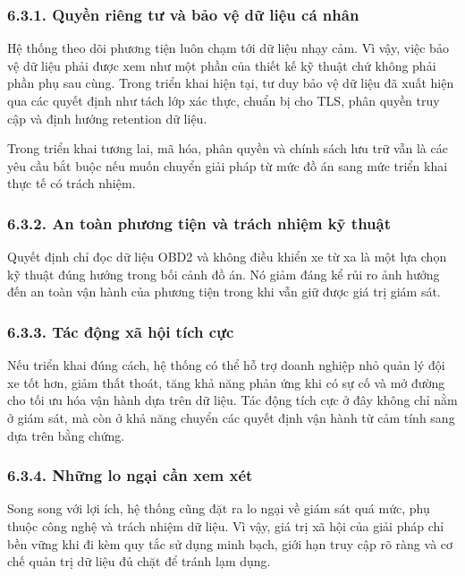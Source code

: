 \documentclass[a4paper]{extarticle}
\begin{document}
\subsubsection{6.3.1. Quyền riêng tư và bảo vệ dữ liệu cá
nhân}\label{631-quyux1ec1n-riuxeang-tux1b0-vuxe0-bux1ea3o-vux1ec7-dux1eef-liux1ec7u-cuxe1-nhuxe2n}

Hệ thống theo dõi phương tiện luôn chạm tới dữ liệu nhạy cảm. Vì vậy, việc bảo vệ dữ liệu phải được xem như một phần của thiết kế kỹ thuật chứ không phải phần phụ sau cùng. Trong triển khai hiện tại, tư duy bảo vệ dữ liệu đã xuất hiện qua các quyết định như tách lớp xác thực, chuẩn bị cho TLS, phân quyền truy cập và định hướng retention dữ liệu.

Trong triển khai tương lai, mã hóa, phân quyền và chính sách lưu trữ vẫn là các yêu cầu bắt buộc nếu muốn chuyển giải pháp từ mức đồ án sang mức triển khai thực tế có trách nhiệm.

\subsubsection{6.3.2. An toàn phương tiện và trách nhiệm kỹ
thuật}\label{632-an-touxe0n-phux1b0ux1a1ng-tiux1ec7n-vuxe0-truxe1ch-nhiux1ec7m-kux1ef9-thuux1eadt}

Quyết định chỉ đọc dữ liệu OBD2 và không điều khiển xe từ xa là một lựa chọn kỹ thuật đúng hướng trong bối cảnh đồ án. Nó giảm đáng kể rủi ro ảnh hưởng đến an toàn vận hành của phương tiện trong khi vẫn giữ được giá trị giám sát.

\subsubsection{6.3.3. Tác động xã hội tích
cực}\label{633-tuxe1c-ux111ux1ed9ng-xuxe3-hux1ed9i-tuxedch-cux1ef1c}

Nếu triển khai đúng cách, hệ thống có thể hỗ trợ doanh nghiệp nhỏ quản lý đội xe tốt hơn, giảm thất thoát, tăng khả năng phản ứng khi có sự cố và mở đường cho tối ưu hóa vận hành dựa trên dữ liệu. Tác động tích cực ở đây không chỉ nằm ở giám sát, mà còn ở khả năng chuyển các quyết định vận hành từ cảm tính sang dựa trên bằng chứng.

\subsubsection{6.3.4. Những lo ngại cần xem
xét}\label{634-nhux1eefng-lo-ngux1ea1i-cux1ea7n-xem-xuxe9t}

Song song với lợi ích, hệ thống cũng đặt ra lo ngại về giám sát quá mức, phụ thuộc công nghệ và trách nhiệm dữ liệu. Vì vậy, giá trị xã hội của giải pháp chỉ bền vững khi đi kèm quy tắc sử dụng minh bạch, giới hạn truy cập rõ ràng và cơ chế quản trị dữ liệu đủ chặt để tránh lạm dụng.
\end{document}
